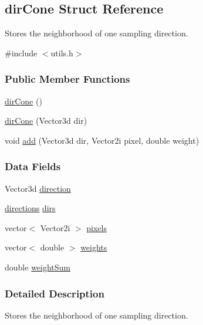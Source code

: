 \hypertarget{structdirCone}{\subsection{dir\-Cone \-Struct \-Reference}
\label{structdirCone}
}


\-Stores the neighborhood of one sampling direction.  




{\ttfamily \#include $<$utils.\-h$>$}

\subsubsection*{\-Public \-Member \-Functions}
\begin{DoxyCompactItemize}
\item 
\hyperlink{structdirCone_a62caac4a9d4d1290171df975aa8f0045}{dir\-Cone} ()
\item 
\hyperlink{structdirCone_ae11918c2e058cf830b6afac73b5b0d39}{dir\-Cone} (\-Vector3d dir)
\item 
void \hyperlink{structdirCone_a2b140af6d384486e933f91e770d2192f}{add} (\-Vector3d dir, \-Vector2i pixel, double weight)
\end{DoxyCompactItemize}
\subsubsection*{\-Data \-Fields}
\begin{DoxyCompactItemize}
\item 
\-Vector3d \hyperlink{structdirCone_ad89d1fbdcde77400f608cdb1f502842d}{direction}
\item 
\hyperlink{utils_8h_aac426d8086789d4d7e318436071c9754}{directions} \hyperlink{structdirCone_ae7bfc1b6c2a55a772e2f6d009dac449d}{dirs}
\item 
vector$<$ \-Vector2i $>$ \hyperlink{structdirCone_ae420701e1029a65d9b79998247985a02}{pixels}
\item 
vector$<$ double $>$ \hyperlink{structdirCone_a4771a6176536f25c585f664b76d69da0}{weights}
\item 
double \hyperlink{structdirCone_a36ba2b6825f43391cac3e7096fc912a9}{weight\-Sum}
\end{DoxyCompactItemize}


\subsubsection{\-Detailed \-Description}
\-Stores the neighborhood of one sampling direction. 

